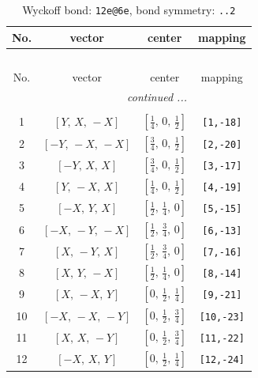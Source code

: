 \documentclass[fleqn,8pt]{jsarticle}
\begin{document}
\renewcommand{\arraystretch}{1.2}
\begin{longtable}{cccc}
\caption{Wyckoff bond: {\tt 12e@6e}, bond symmetry: {\tt ..2}}
 \\
 \hline \hline
No. & vector & center & mapping \\ \hline \endfirsthead

\multicolumn{3}{l}{\tablename\ \thetable{}} \\
 \hline \hline
No. & vector & center & mapping \\ \hline \endhead

 \hline \hline
\multicolumn{3}{r}{\footnotesize\it continued ...} \\ \endfoot

 \hline \hline
\multicolumn{3}{r}{} \\ \endlastfoot

1 & $\left[ Y,\, X,\, - X \right]$ & $\left[ \frac{1}{4},\, 0,\, \frac{1}{2} \right]$ & {\tt [1,-18]} \\ \hline
2 & $\left[ - Y,\, - X,\, - X \right]$ & $\left[ \frac{3}{4},\, 0,\, \frac{1}{2} \right]$ & {\tt [2,-20]} \\ \hline
3 & $\left[ - Y,\, X,\, X \right]$ & $\left[ \frac{3}{4},\, 0,\, \frac{1}{2} \right]$ & {\tt [3,-17]} \\ \hline
4 & $\left[ Y,\, - X,\, X \right]$ & $\left[ \frac{1}{4},\, 0,\, \frac{1}{2} \right]$ & {\tt [4,-19]} \\ \hline
5 & $\left[ - X,\, Y,\, X \right]$ & $\left[ \frac{1}{2},\, \frac{1}{4},\, 0 \right]$ & {\tt [5,-15]} \\ \hline
6 & $\left[ - X,\, - Y,\, - X \right]$ & $\left[ \frac{1}{2},\, \frac{3}{4},\, 0 \right]$ & {\tt [6,-13]} \\ \hline
7 & $\left[ X,\, - Y,\, X \right]$ & $\left[ \frac{1}{2},\, \frac{3}{4},\, 0 \right]$ & {\tt [7,-16]} \\ \hline
8 & $\left[ X,\, Y,\, - X \right]$ & $\left[ \frac{1}{2},\, \frac{1}{4},\, 0 \right]$ & {\tt [8,-14]} \\ \hline
9 & $\left[ X,\, - X,\, Y \right]$ & $\left[ 0,\, \frac{1}{2},\, \frac{1}{4} \right]$ & {\tt [9,-21]} \\ \hline
10 & $\left[ - X,\, - X,\, - Y \right]$ & $\left[ 0,\, \frac{1}{2},\, \frac{3}{4} \right]$ & {\tt [10,-23]} \\ \hline
11 & $\left[ X,\, X,\, - Y \right]$ & $\left[ 0,\, \frac{1}{2},\, \frac{3}{4} \right]$ & {\tt [11,-22]} \\ \hline
12 & $\left[ - X,\, X,\, Y \right]$ & $\left[ 0,\, \frac{1}{2},\, \frac{1}{4} \right]$ & {\tt [12,-24]} \\
\end{longtable}
\end{document}
